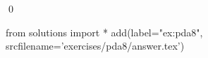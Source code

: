 
\begin{ex} 
  \label{ex:pda8}
  
  \qed
\end{ex} 
\begin{python0}
from solutions import *
add(label="ex:pda8",
    srcfilename='exercises/pda8/answer.tex') 
\end{python0}
